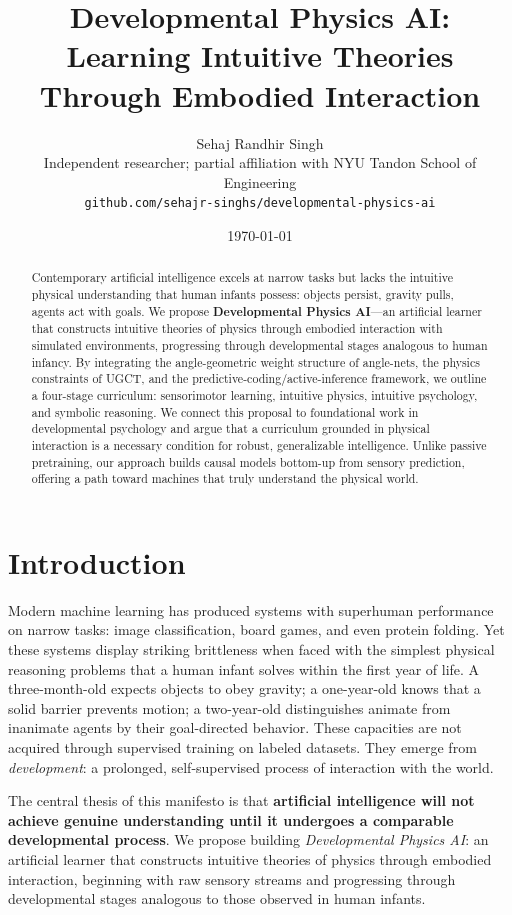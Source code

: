 \documentclass[11pt,oneside]{article}
\title{\textbf{Developmental Physics AI:\\
Learning Intuitive Theories Through Embodied Interaction}}
\author{
  Sehaj Randhir Singh\\
  Independent researcher; partial affiliation with NYU Tandon School of Engineering\\
  \texttt{github.com/sehajr-singhs/developmental-physics-ai}
}
\date{\today}
\begin{document}
\maketitle

\begin{abstract}
Contemporary artificial intelligence excels at narrow tasks but lacks the intuitive physical understanding that human infants possess: objects persist, gravity pulls, agents act with goals. We propose \textbf{Developmental Physics AI}---an artificial learner that constructs intuitive theories of physics through embodied interaction with simulated environments, progressing through developmental stages analogous to human infancy. By integrating the angle-geometric weight structure of angle-nets, the physics constraints of UGCT, and the predictive-coding/active-inference framework, we outline a four-stage curriculum: sensorimotor learning, intuitive physics, intuitive psychology, and symbolic reasoning. We connect this proposal to foundational work in developmental psychology and argue that a curriculum grounded in physical interaction is a necessary condition for robust, generalizable intelligence. Unlike passive pretraining, our approach builds causal models bottom-up from sensory prediction, offering a path toward machines that truly understand the physical world.
\end{abstract}

\section{Introduction}

Modern machine learning has produced systems with superhuman performance on narrow tasks: image classification, board games, and even protein folding. Yet these systems display striking brittleness when faced with the simplest physical reasoning problems that a human infant solves within the first year of life. A three-month-old expects objects to obey gravity; a one-year-old knows that a solid barrier prevents motion; a two-year-old distinguishes animate from inanimate agents by their goal-directed behavior. These capacities are not acquired through supervised training on labeled datasets. They emerge from {\em development}: a prolonged, self-supervised process of interaction with the world.

The central thesis of this manifesto is that \textbf{artificial intelligence will not achieve genuine understanding until it undergoes a comparable developmental process}. We propose building \emph{Developmental Physics AI}: an artificial learner that constructs intuitive theories of physics through embodied interaction, beginning with raw sensory streams and progressing through developmental stages analogous to those observed in human infants.
\end{document}
